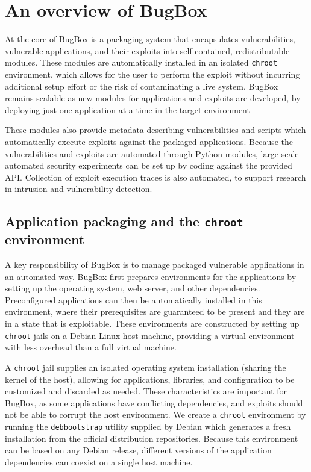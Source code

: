 \documentclass[letterpaper,twocolumn,10pt]{article}
\begin{document}
\section{An overview of BugBox}

At the core of BugBox is a packaging system that encapsulates vulnerabilities, vulnerable applications, and their exploits into self-contained, redistributable modules. These modules are automatically installed in an isolated \texttt{chroot} environment, which allows for the user to perform the exploit without incurring additional setup effort or the risk of contaminating a live system. BugBox remains scalable as new modules for applications and exploits are developed, by deploying just one application at a time in the target environment

These modules also provide metadata describing vulnerabilities and scripts which automatically execute exploits against the packaged applications. Because the vulnerabilities and exploits are automated through Python modules, large-scale automated security experiments can be set up by coding against the provided API. Collection of exploit execution traces is also automated, to support research in intrusion and vulnerability detection.

\subsection{Application packaging and the {\tt chroot} environment}

A key responsibility of BugBox is to manage packaged vulnerable applications in an automated way. BugBox first prepares environments for the applications by setting up the operating system, web server, and other dependencies. Preconfigured applications can then be automatically installed in this environment, where their prerequisites are guaranteed to be present and they are in a state that is exploitable. These environments are constructed by setting up {\tt chroot} jails on a Debian Linux host machine, providing a virtual environment with less overhead than a full virtual machine.



A \texttt{chroot} jail supplies an isolated operating system installation (sharing the kernel of the host), allowing for applications, libraries, and configuration to be customized and discarded as needed. These characteristics are important for BugBox, as some applications have conflicting dependencies, and exploits should not be able to corrupt the host environment. We create a \texttt{chroot} environment by running the \texttt{debbootstrap} utility supplied by Debian which generates a fresh installation from the official distribution repositories. Because this environment can be based on any Debian release, different versions of the application dependencies can coexist on a single host machine. 
\end{document}
